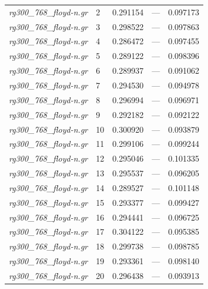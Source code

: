 \documentclass[12pt]{article}
\begin{document}
\begin{longtable}{l|l|lll}
\textit{rg300\_768\_floyd-n.gr}  &  2        & 0.291154               & ---                  & 0.097173                   \\
\textit{rg300\_768\_floyd-n.gr}  &  3        & 0.298522               & ---                  & 0.097863                   \\
\textit{rg300\_768\_floyd-n.gr}  &  4        & 0.286472               & ---                  & 0.097455                   \\
\textit{rg300\_768\_floyd-n.gr}  &  5        & 0.289122               & ---                  & 0.098396                   \\
\textit{rg300\_768\_floyd-n.gr}  &  6        & 0.289937               & ---                  & 0.091062                   \\
\textit{rg300\_768\_floyd-n.gr}  &  7        & 0.294530               & ---                  & 0.094978                   \\
\textit{rg300\_768\_floyd-n.gr}  &  8        & 0.296994               & ---                  & 0.096971                   \\
\textit{rg300\_768\_floyd-n.gr}  &  9        & 0.292182               & ---                  & 0.092122                   \\
\textit{rg300\_768\_floyd-n.gr}  &  10       & 0.300920               & ---                  & 0.093879                   \\
\textit{rg300\_768\_floyd-n.gr}  &  11       & 0.299106               & ---                  & 0.099244                   \\
\textit{rg300\_768\_floyd-n.gr}  &  12       & 0.295046               & ---                  & 0.101335                   \\
\textit{rg300\_768\_floyd-n.gr}  &  13       & 0.295537               & ---                  & 0.096205                   \\
\textit{rg300\_768\_floyd-n.gr}  &  14       & 0.289527               & ---                  & 0.101148                   \\
\textit{rg300\_768\_floyd-n.gr}  &  15       & 0.293377               & ---                  & 0.099427                   \\
\textit{rg300\_768\_floyd-n.gr}  &  16       & 0.294441               & ---                  & 0.096725                   \\
\textit{rg300\_768\_floyd-n.gr}  &  17       & 0.304122               & ---                  & 0.095385                   \\
\textit{rg300\_768\_floyd-n.gr}  &  18       & 0.299738               & ---                  & 0.098785                   \\
\textit{rg300\_768\_floyd-n.gr}  &  19       & 0.293361               & ---                  & 0.098140                   \\
\textit{rg300\_768\_floyd-n.gr}  &  20       & 0.296438               & ---                  & 0.093913  \\ \hline
\end{longtable}



\end{document}
